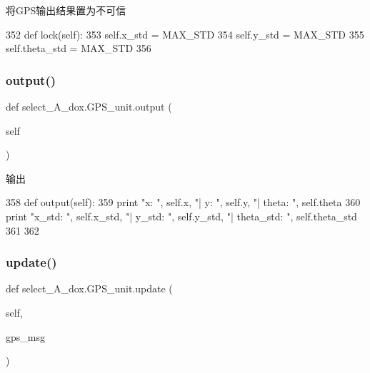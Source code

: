 将\+G\+P\+S输出结果置为不可信 


\begin{DoxyCode}
352     \textcolor{keyword}{def }lock(self):
353         self.x\_std = MAX\_STD
354         self.y\_std = MAX\_STD
355         self.theta\_std = MAX\_STD
356 
\end{DoxyCode}
\mbox{\label{classselect___a__dox_1_1_g_p_s__unit_a8583eb7e0a8c7caf49ac0e83bf4a11e8}} 
\subsubsection{\texorpdfstring{output()}{output()}}
{\footnotesize\ttfamily def select\+\_\+\+A\+\_\+dox.\+G\+P\+S\+\_\+unit.\+output (\begin{DoxyParamCaption}\item[{}]{self }\end{DoxyParamCaption})}



输出 


\begin{DoxyCode}
358     \textcolor{keyword}{def }output(self):
359         \textcolor{keywordflow}{print} \textcolor{stringliteral}{"x: "}, self.x, \textcolor{stringliteral}{"| y: "}, self.y, \textcolor{stringliteral}{"| theta: "}, self.theta
360         \textcolor{keywordflow}{print} \textcolor{stringliteral}{"x\_std: "}, self.x\_std, \textcolor{stringliteral}{"| y\_std: "}, self.y\_std, \textcolor{stringliteral}{"| theta\_std: "}, self.theta\_std
361 
362 
\end{DoxyCode}
\mbox{\label{classselect___a__dox_1_1_g_p_s__unit_ae49eca50eb5cebf93140174f26de28bc}} 
\subsubsection{\texorpdfstring{update()}{update()}}
{\footnotesize\ttfamily def select\+\_\+\+A\+\_\+dox.\+G\+P\+S\+\_\+unit.\+update (\begin{DoxyParamCaption}\item[{}]{self,  }\item[{}]{gps\+\_\+msg }\end{DoxyParamCaption})}



